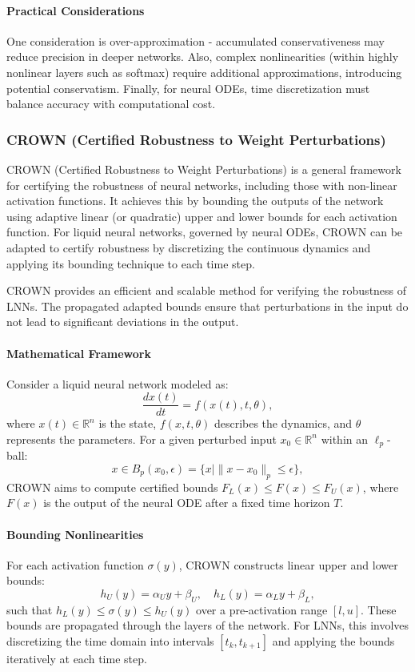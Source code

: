 \paragraph{Practical Considerations}
One consideration is over-approximation - accumulated conservativeness may reduce precision in deeper networks. Also, complex nonlinearities (within highly nonlinear layers such as softmax) require additional approximations, introducing potential conservatism. Finally, for neural ODEs, time discretization must balance accuracy with computational cost.

\subsubsection*{CROWN (Certified Robustness to Weight Perturbations)}

CROWN (Certified Robustness to Weight Perturbations) \cite{zhangEfficientNeuralNetwork2018} is a general framework for certifying the robustness of neural networks, including those with non-linear activation functions. It achieves this by bounding the outputs of the network using adaptive linear (or quadratic) upper and lower bounds for each activation function. For liquid neural networks, governed by neural ODEs, CROWN can be adapted to certify robustness by discretizing the continuous dynamics and applying its bounding technique to each time step.

CROWN provides an efficient and scalable method for verifying the robustness of LNNs. The propagated adapted bounds ensure that perturbations in the input do not lead to significant deviations in the output.

\paragraph{Mathematical Framework}
Consider a liquid neural network modeled as:
\[
\frac{dx(t)}{dt} = f(x(t), t, \theta),
\]
where \(x(t) \in \mathbb{R}^n\) is the state, \(f(x, t, \theta)\) describes the dynamics, and \(\theta\) represents the parameters. For a given perturbed input \(x_0 \in \mathbb{R}^n\) within an \(\ell_p\)-ball:
\[
x \in B_p(x_0, \epsilon) = \{x \mid \|x - x_0\|_p \leq \epsilon\},
\]
CROWN aims to compute certified bounds \(F_L(x) \leq F(x) \leq F_U(x)\), where \(F(x)\) is the output of the neural ODE after a fixed time horizon \(T\).

\paragraph{Bounding Nonlinearities}
For each activation function \(\sigma(y)\), CROWN constructs linear upper and lower bounds:
\[
h_U(y) = \alpha_U y + \beta_U, \quad h_L(y) = \alpha_L y + \beta_L,
\]
such that \(h_L(y) \leq \sigma(y) \leq h_U(y)\) over a pre-activation range \([l, u]\). These bounds are propagated through the layers of the network. For LNNs, this involves discretizing the time domain into intervals \([t_k, t_{k+1}]\) and applying the bounds iteratively at each time step.

